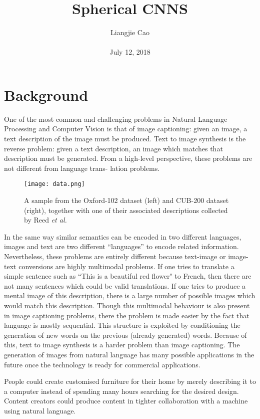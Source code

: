 \documentclass[10pt,twocolumn,letterpaper]{article}
\begin{document}
\title{\textbf{Spherical CNNS
}}
\author{Liangjie Cao\\\\ July 12, 2018}
\maketitle
\section{Background}
One of the most common and challenging problems in Natural Language Processing and
Computer Vision is that of image captioning: given an image, a text description of the
image must be produced. Text to image synthesis is the reverse problem: given a text
description, an image which matches that description must be generated.
From a high-level perspective, these problems are not different from language trans-
lation problems.
\begin{figure}[!htb]
 \centering
 \texttt{[image: data.png]}\\
 \caption{A sample from the Oxford-102 dataset (left) and CUB-200 dataset (right), together
with one of their associated descriptions collected by Reed \emph{et al.}~\cite{name1}}\label{Figure1} \end{figure}
\par In the same way similar semantics can be encoded in two different
languages, images and text are two different “languages” to encode related information.
Nevertheless, these problems are entirely different because text-image or image-text
conversions are highly multimodal problems. If one tries to translate a simple sentence such as ``This is a beautiful red flower" to French, then there are not many sentences which could be valid translations. If one tries to produce a mental image of this description, there is a large number of possible images which would match this description. Though this multimodal behaviour is also present in image captioning problems, there the problem is made easier by the fact that language is mostly sequential. This structure is exploited by conditioning the generation of new words on the previous (already generated) words. Because of this, text to image synthesis is a harder problem than image captioning.
The generation of images from natural language has many possible applications in
the future once the technology is ready for commercial applications. 
\par People could create customised furniture for their home by merely describing it to a computer instead of spending many hours searching for the desired design. Content creators could produce content in tighter collaboration with a machine using natural language.
\end{document}
